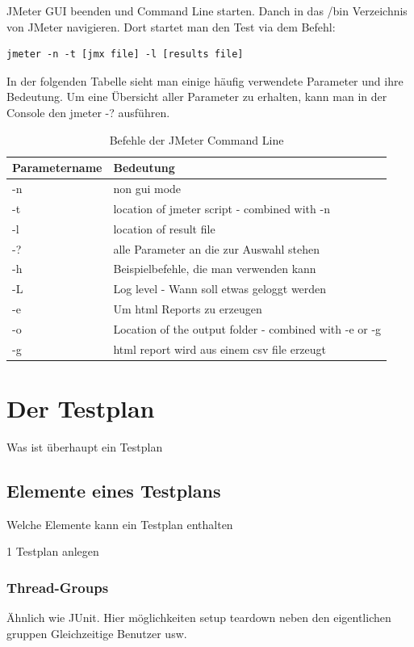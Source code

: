 \documentclass[a4paper,12pt]{article}
\begin{document}
JMeter GUI beenden und Command Line starten. Danch in das /bin Verzeichnis von JMeter navigieren. Dort startet man den Test via dem Befehl:
\begin{lstlisting}[style=Cpp]
  jmeter -n -t [jmx file] -l [results file]
\end{lstlisting}
In der folgenden Tabelle sieht man einige häufig verwendete Parameter und ihre Bedeutung. Um eine Übersicht aller Parameter zu erhalten, kann man in der Console den jmeter -? ausführen.
\begin{table}[H]
	\centering
	\begin{tabular}{|l|l|}
		\hline
		\textbf{Parametername} & \textbf{Bedeutung} \\
		\hline
		-n & non gui mode \\
		-t & location of jmeter script - combined with -n \\
		-l & location of result file \\
		-? & alle Parameter an die zur Auswahl stehen \\
		-h & Beispielbefehle, die man verwenden kann \\
		-L & Log level - Wann soll etwas geloggt werden \\
		-e & Um html Reports zu erzeugen\\
		-o & Location of the output folder - combined with -e or -g \\
		-g & html report wird aus einem csv file erzeugt \\ 
		\hline
	\end{tabular}
	\caption[tab_parameter_non_gui]{Befehle der JMeter Command Line}
	\label{tab_parameter_non_gui}
\end{table}





\section{Der Testplan}
Was ist überhaupt ein Testplan
\subsection{Elemente eines Testplans}
Welche Elemente kann ein Testplan enthalten

1 Testplan anlegen
\subsubsection{Thread-Groups}
Ähnlich wie JUnit. Hier möglichkeiten setup teardown neben den eigentlichen gruppen
Gleichzeitige Benutzer usw.
\end{document}
